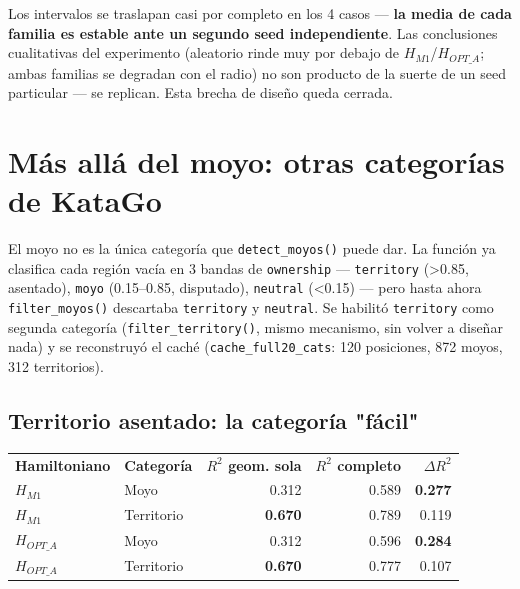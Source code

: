\documentclass[11pt, a4paper]{article}
\newcommand{\TH}[1]{\cellcolor{cTHbg}\color{white}\textbf{#1}}
\newcommand{\good}[1]{\color{cGood}\textbf{#1}}
\begin{document}
\begin{tcolorbox}[quotebox]
  Los intervalos se traslapan casi por completo en los 4 casos ---
  \textbf{la media de cada familia es estable ante un segundo seed
  independiente}. Las conclusiones cualitativas del experimento
  (aleatorio rinde muy por debajo de $H_{M1}$/$H_{OPT\_A}$; ambas
  familias se degradan con el radio) no son producto de la suerte de
  un seed particular --- se replican. Esta brecha de dise\~no queda
  cerrada.
\end{tcolorbox}

\section{M\'as all\'a del moyo: otras categor\'ias de KataGo}
\label{sec:categorias}

El moyo no es la \'unica categor\'ia que \texttt{detect\_moyos()} puede
dar. La funci\'on ya clasifica cada regi\'on vac\'ia en 3 bandas de
\texttt{ownership} --- \texttt{territory} (>0.85, asentado),
\texttt{moyo} (0.15--0.85, disputado), \texttt{neutral} (<0.15) --- pero
hasta ahora \texttt{filter\_moyos()} descartaba \texttt{territory} y
\texttt{neutral}. Se habilit\'o \texttt{territory} como segunda
categor\'ia (\texttt{filter\_territory()}, mismo mecanismo, sin volver
a dise\~nar nada) y se reconstruy\'o el cach\'e
(\texttt{cache\_full20\_cats}: 120 posiciones, 872 moyos, 312
territorios).

\subsection{Territorio asentado: la categor\'ia "f\'acil"}

\medskip
\begin{center}
\begin{tabular}{llrrr}
  \TH{Hamiltoniano} & \TH{Categor\'ia} & \TH{$R^2$ geom. sola} & \TH{$R^2$ completo} & \TH{$\Delta R^2$} \\[1pt]
  $H_{M1}$      & Moyo       & 0.312 & 0.589 & \good{0.277} \\
  $H_{M1}$      & Territorio & \good{0.670} & 0.789 & 0.119 \\
  $H_{OPT\_A}$  & Moyo       & 0.312 & 0.596 & \good{0.284} \\
  $H_{OPT\_A}$  & Territorio & \good{0.670} & 0.777 & 0.107 \\
\end{tabular}
\end{center}
\medskip
\end{document}
